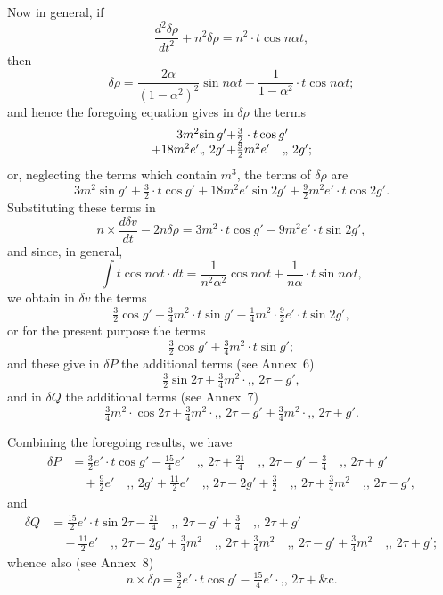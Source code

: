 \documentclass[11pt,a4paper]{book}
\providecommand{\mypar}{\par}
\begin{document}
{{\mypar
Now in general, if
\[
\frac{d^2\delta\rho}{dt^2} + n^2\delta\rho = n^2 \cdot t\cos n\alpha t,
\]
then
\[
\delta\rho = \frac{2\alpha}{(1-\alpha^2)^2}\sin n\alpha t + \frac{1}{1-\alpha^2} \cdot t\cos n\alpha t;
\]
and hence the foregoing equation gives in $\delta\rho$ the terms
\[
\begin{array}{r@{}l@{}l}
3m^2 & \sin g' & + \tfrac{3}{2} \cdot t\cos g'\\
+ 18m^2e' & \text{,, } 2g' & + \tfrac{9}{2}m^2e' \quad \text{,, } 2g';
\end{array}
\]
or, neglecting the terms which contain $m^3$, the terms of $\delta\rho$ are
\[
3m^2 \sin g' + \tfrac{3}{2} \cdot t\cos g' + 18m^2e' \sin 2g' + \tfrac{9}{2}m^2e' \cdot t\cos 2g'.
\]
Substituting these terms in
\[
n \times \frac{d\delta v}{dt} - 2n\delta\rho = 3m^2 \cdot t\cos g' - 9m^2e' \cdot t\sin 2g',
\]
and since, in general,
\[
\int t\cos n\alpha t \cdot dt = \frac{1}{n^2\alpha^2}\cos n\alpha t + \frac{1}{n\alpha} \cdot t\sin n\alpha t,
\]
we obtain in $\delta v$ the terms
\[
\tfrac{3}{2}\cos g' + \tfrac{3}{4}m^2 \cdot t\sin g'
- \tfrac{1}{4}m^2 \cdot \tfrac{9}{2}e' \cdot t\sin 2g',
\]
or for the present purpose the terms
\[
\tfrac{3}{2}\cos g' + \tfrac{3}{4}m^2 \cdot t\sin g';
\]
and these give in $\delta P$ the additional terms (see Annex~6)
\[
\tfrac{3}{2}\sin 2\tau + \tfrac{3}{4}m^2 \cdot \text{,, } 2\tau - g',
\]
and in $\delta Q$ the additional terms (see Annex~7)
\[
\tfrac{3}{4}m^2 \cdot \cos 2\tau + \tfrac{3}{4}m^2 \cdot \text{,, } 2\tau - g'
+ \tfrac{3}{4}m^2 \cdot \text{,, } 2\tau + g'.
\]

\mypar
Combining the foregoing results, we have
\begin{align*}
\delta P &= \tfrac{3}{2}e' \cdot t\cos g' - \tfrac{15}{4}e' \quad \text{,, } 2\tau
 + \tfrac{21}{4} \quad \text{,, } 2\tau - g'
 - \tfrac{3}{4} \quad \text{,, } 2\tau + g'\\
&\quad + \tfrac{9}{2}e' \quad \text{,, } 2g'
 + \tfrac{11}{2}e' \quad \text{,, } 2\tau - 2g'
 + \tfrac{3}{2} \quad \text{,, } 2\tau
 + \tfrac{3}{4}m^2 \quad \text{,, } 2\tau - g',
\end{align*}
and
\begin{align*}
\delta Q &= \tfrac{15}{2}e' \cdot t\sin 2\tau
 - \tfrac{21}{4} \quad \text{,, } 2\tau - g'
 + \tfrac{3}{4} \quad \text{,, } 2\tau + g'\\
&\quad - \tfrac{11}{2}e' \quad \text{,, } 2\tau - 2g'
 + \tfrac{3}{4}m^2 \quad \text{,, } 2\tau
 + \tfrac{3}{4}m^2 \quad \text{,, } 2\tau - g'
 + \tfrac{3}{4}m^2 \quad \text{,, } 2\tau + g';
\end{align*}
whence also (see Annex~8)
\[
n \times \delta\rho = \tfrac{3}{2}e' \cdot t\cos g' - \tfrac{15}{4}e' \cdot \text{,, } 2\tau
+ \&\mathrm{c}.
\]

}}
\end{document}

